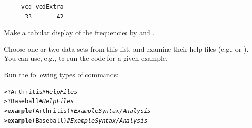 \documentclass[10pt]{report}\usepackage[]{graphicx}\usepackage[]{color}
\makeatletter
\newcommand{\hlcom}[1]{\textcolor[rgb]{0.678,0.584,0.686}{\textit{#1}}}%
\newcommand{\hlopt}[1]{\textcolor[rgb]{0,0,0}{#1}}%
\newcommand{\hlstd}[1]{\textcolor[rgb]{0.345,0.345,0.345}{#1}}%
\newcommand{\hlkwd}[1]{\textcolor[rgb]{0.737,0.353,0.396}{\textbf{#1}}}%
\newenvironment{kframe}{%
 \def\at@end@of@kframe{}%
 \ifinner\ifhmode%
  \def\at@end@of@kframe{\end{minipage}}%
  \begin{minipage}{\columnwidth}%
 \fi\fi%
 \def\FrameCommand##1{\hskip\@totalleftmargin \hskip-\fboxsep
 \colorbox{shadecolor}{##1}\hskip-\fboxsep
     \hskip-\linewidth \hskip-\@totalleftmargin \hskip\columnwidth}%
 \MakeFramed {\advance\hsize-\width
   \@totalleftmargin\z@ \linewidth\hsize
   \@setminipage}}%
 {\par\unskip\endMakeFramed%
 \at@end@of@kframe}
\newenvironment{knitrout}{}{} %
\renewenvironment{knitrout}{\small\renewcommand{\baselinestretch}{.85}}{} %
\makeatother
\begin{document}
\begin{Exercises}
\begin{enumerate*}
\begin{ans}
\begin{knitrout}
\begin{kframe}
\begin{verbatim}
     vcd vcdExtra 
      33       42 
\end{verbatim}
\end{kframe}
\end{knitrout}
    \end{ans}
    
    
    \item Make a tabular display of the frequencies by  and .
    
    
    \item Choose one or two data sets from this list, and examine their help files
    (e.g.,  or ).  You can use, e.g.,
     to run the \R code for a given example.
    \begin{ans}
    Run the following types of commands:
\begin{knitrout}\footnotesize
{}\color{fgcolor}\begin{kframe}
\begin{alltt}
\hlstd{> }\hlopt{?}\hlstd{Arthritis}          \hlcom{#Help Files}
\hlstd{> }\hlopt{?}\hlstd{Baseball}           \hlcom{#Help Files}
\hlstd{> }\hlkwd{example}\hlstd{(Arthritis)}  \hlcom{#Example Syntax/Analysis}
\hlstd{> }\hlkwd{example}\hlstd{(Baseball)}   \hlcom{#Example Syntax/Analysis}
\end{alltt}
\end{kframe}
\end{knitrout}
    \end{ans}
    
    
  \end{enumerate*}


\end{Exercises}
\end{document}

